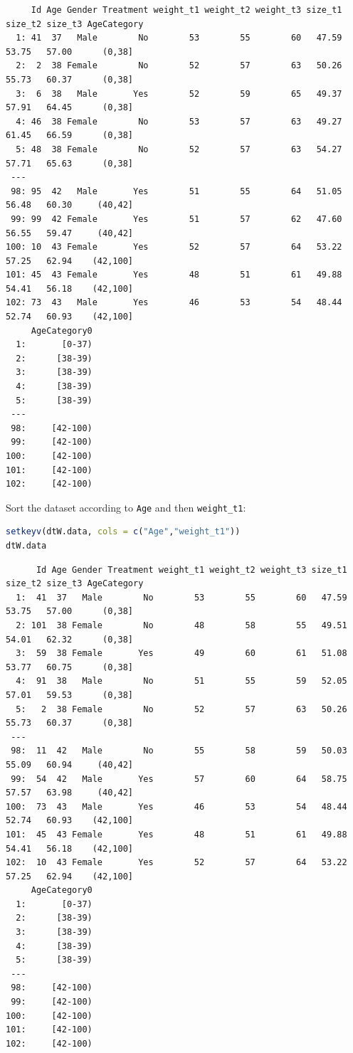 \documentclass{article}
\begin{document}
\label{}
\begin{verbatim}
     Id Age Gender Treatment weight_t1 weight_t2 weight_t3 size_t1 size_t2 size_t3 AgeCategory
  1: 41  37   Male        No        53        55        60   47.59   53.75   57.00      (0,38]
  2:  2  38 Female        No        52        57        63   50.26   55.73   60.37      (0,38]
  3:  6  38   Male       Yes        52        59        65   49.37   57.91   64.45      (0,38]
  4: 46  38 Female        No        53        57        63   49.27   61.45   66.59      (0,38]
  5: 48  38 Female        No        52        57        63   54.27   57.71   65.63      (0,38]
 ---                                                                                          
 98: 95  42   Male       Yes        51        55        64   51.05   56.48   60.30     (40,42]
 99: 99  42 Female       Yes        51        57        62   47.60   56.55   59.47     (40,42]
100: 10  43 Female       Yes        52        57        64   53.22   57.25   62.94    (42,100]
101: 45  43 Female       Yes        48        51        61   49.88   54.41   56.18    (42,100]
102: 73  43   Male       Yes        46        53        54   48.44   52.74   60.93    (42,100]
     AgeCategory0
  1:       [0-37)
  2:      [38-39)
  3:      [38-39)
  4:      [38-39)
  5:      [38-39)
 ---             
 98:     [42-100)
 99:     [42-100)
100:     [42-100)
101:     [42-100)
102:     [42-100)
\end{verbatim}

Sort the dataset according to \texttt{Age} and then \texttt{weight\_t1}:
\begin{lstlisting}[language=r,numbers=none]
setkeyv(dtW.data, cols = c("Age","weight_t1"))
dtW.data
\end{lstlisting}

\label{}
\begin{verbatim}
      Id Age Gender Treatment weight_t1 weight_t2 weight_t3 size_t1 size_t2 size_t3 AgeCategory
  1:  41  37   Male        No        53        55        60   47.59   53.75   57.00      (0,38]
  2: 101  38 Female        No        48        58        55   49.51   54.01   62.32      (0,38]
  3:  59  38 Female       Yes        49        60        61   51.08   53.77   60.75      (0,38]
  4:  91  38   Male        No        51        55        59   52.05   57.01   59.53      (0,38]
  5:   2  38 Female        No        52        57        63   50.26   55.73   60.37      (0,38]
 ---                                                                                           
 98:  11  42   Male        No        55        58        59   50.03   55.09   60.94     (40,42]
 99:  54  42   Male       Yes        57        60        64   58.75   57.57   63.98     (40,42]
100:  73  43   Male       Yes        46        53        54   48.44   52.74   60.93    (42,100]
101:  45  43 Female       Yes        48        51        61   49.88   54.41   56.18    (42,100]
102:  10  43 Female       Yes        52        57        64   53.22   57.25   62.94    (42,100]
     AgeCategory0
  1:       [0-37)
  2:      [38-39)
  3:      [38-39)
  4:      [38-39)
  5:      [38-39)
 ---             
 98:     [42-100)
 99:     [42-100)
100:     [42-100)
101:     [42-100)
102:     [42-100)
\end{verbatim}
\end{document}
